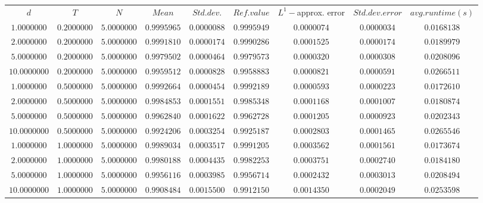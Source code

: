 \begin{tabular}{ccccccccc}
$d$ & $T$ & $N$ & $Mean$ & $Std. dev.$ & $Ref. value$ & $L^1-$approx. error & $Std. dev. error$ & $avg. runtime (s)$\\
$1.0000000$ & $0.2000000$ & $5.0000000$ & $0.9995965$ & $0.0000088$ & $0.9995949$ & $0.0000074$ & $0.0000034$ & $0.0168138$\\
$2.0000000$ & $0.2000000$ & $5.0000000$ & $0.9991810$ & $0.0000174$ & $0.9990286$ & $0.0001525$ & $0.0000174$ & $0.0189979$\\
$5.0000000$ & $0.2000000$ & $5.0000000$ & $0.9979502$ & $0.0000464$ & $0.9979573$ & $0.0000320$ & $0.0000308$ & $0.0208096$\\
$10.0000000$ & $0.2000000$ & $5.0000000$ & $0.9959512$ & $0.0000828$ & $0.9958883$ & $0.0000821$ & $0.0000591$ & $0.0266511$\\
$1.0000000$ & $0.5000000$ & $5.0000000$ & $0.9992664$ & $0.0000454$ & $0.9992189$ & $0.0000593$ & $0.0000223$ & $0.0172610$\\
$2.0000000$ & $0.5000000$ & $5.0000000$ & $0.9984853$ & $0.0001551$ & $0.9985348$ & $0.0001168$ & $0.0001007$ & $0.0180874$\\
$5.0000000$ & $0.5000000$ & $5.0000000$ & $0.9962840$ & $0.0001622$ & $0.9962728$ & $0.0001205$ & $0.0000923$ & $0.0202343$\\
$10.0000000$ & $0.5000000$ & $5.0000000$ & $0.9924206$ & $0.0003254$ & $0.9925187$ & $0.0002803$ & $0.0001465$ & $0.0265546$\\
$1.0000000$ & $1.0000000$ & $5.0000000$ & $0.9989034$ & $0.0003517$ & $0.9991205$ & $0.0003562$ & $0.0001561$ & $0.0173674$\\
$2.0000000$ & $1.0000000$ & $5.0000000$ & $0.9980188$ & $0.0004435$ & $0.9982253$ & $0.0003751$ & $0.0002740$ & $0.0184180$\\
$5.0000000$ & $1.0000000$ & $5.0000000$ & $0.9956116$ & $0.0003985$ & $0.9956714$ & $0.0002432$ & $0.0003013$ & $0.0208494$\\
$10.0000000$ & $1.0000000$ & $5.0000000$ & $0.9908484$ & $0.0015500$ & $0.9912150$ & $0.0014350$ & $0.0002049$ & $0.0253598$\\
\end{tabular}
